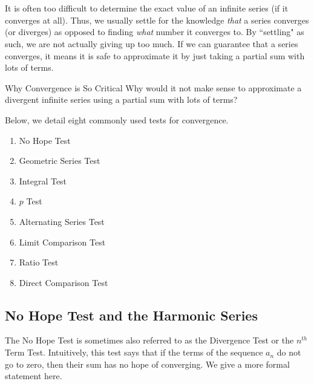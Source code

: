 \section{}\label{conv}

It is often too difficult to determine the exact value of an infinite series (if it converges at all).  Thus, we usually settle for the knowledge \emph{that} a series converges (or diverges) as opposed to finding \emph{what} number it converges to.  By ``settling" as such, we are not actually giving up too much.  If we can guarantee that a series converges, it means it is safe to approximate it by just taking a partial sum with lots of terms.  

\begin{exercise}{Why Convergence is So Critical \Coffeecup \Coffeecup}
Why would it not make sense to approximate a divergent infinite series using a partial sum with lots of terms?
\end{exercise}

Below, we detail eight commonly used tests for convergence.

\begin{enumerate}
\item No Hope Test
\item Geometric Series Test
\item Integral Test
\item $p$ Test
\item Alternating Series Test
\item Limit Comparison Test
\item Ratio Test
\item Direct Comparison Test
\end{enumerate}

\subsection{No Hope Test and the Harmonic Series}\label{TomaytoWithMayo}
The No Hope Test is sometimes also referred to as the Divergence Test or the $n^{th}$ Term Test.  Intuitively, this test says that if the terms of the sequence $a_n$ do not go to zero, then their sum has no hope of converging.  We give a more formal statement here.

